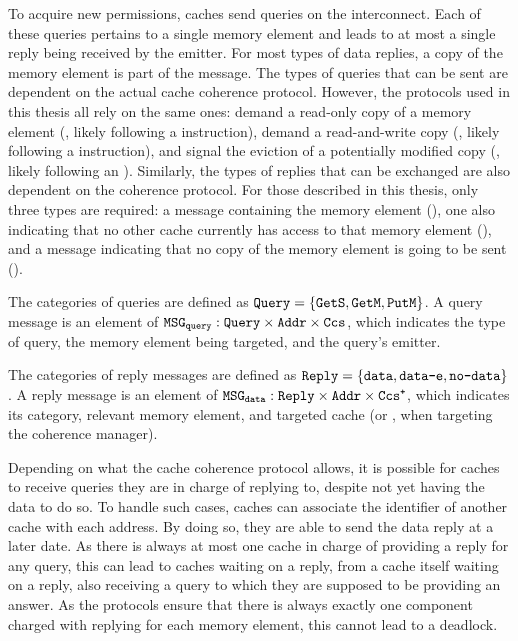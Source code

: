 To acquire new permissions, caches send queries on the interconnect. Each of
these queries pertains to a single memory element and leads to at most a single
reply being received by the emitter. For most types of data replies, a copy of
the memory element is part of the message. The types of queries that can be
sent are dependent on the actual cache coherence protocol. However, the
protocols used in this thesis all rely on the same ones: demand a read-only
copy of a memory element (\getsquery, likely following a \loadinstr{}
instruction), demand a read-and-write copy (\getmquery, likely following a
\storeinstr{} instruction), and signal the eviction of a potentially modified
copy (\putmquery, likely following an \evictinstr{}). Similarly, the
types of replies that can be exchanged are also dependent on the coherence
protocol. For those described in this thesis, only three types are required: a
message containing the memory element (\simpledata), one also indicating that
no other cache currently has access to that memory element (\exclusivedata),
and a message indicating that no copy of the memory element is going to be sent
(\nodata).

\begin{definition}[Query]
The categories of queries are defined as $\text{\texttt{Query}}{} = \{\text{\texttt{GetS}},
\text{\texttt{GetM}}, \text{\texttt{PutM}}\}$. A query message is an element of
$\text{\texttt{MSG\textsubscript{query}}}{}: \text{\texttt{Query}}{} \times \text{\texttt{Addr}}{} \times \text{\texttt{Ccs}}$, which
indicates the type of query, the memory element being targeted, and the
query's emitter.
\end{definition}

\begin{definition}[Reply]
The categories of reply messages are defined as $\text{\texttt{Reply}}{} = \{\text{\texttt{data}},
\allowbreak{}
\text{\texttt{data-e}},\allowbreak{} \text{\texttt{no-data}}\}$. A reply message is an element of $\text{\texttt{MSG\textsubscript{data}}}{}:
\text{\texttt{Reply}}{} \times \text{\texttt{Addr}}{} \times \text{\texttt{Ccs\textsuperscript{+}}}{}$, which indicates
its category, relevant memory element, and targeted cache (or \cmgr{}, when
targeting the coherence manager).
\end{definition}

Depending on what the cache coherence protocol allows, it is possible for
caches to receive queries they are in charge of replying to, despite not yet
having the data to do so. To handle such cases, caches can associate the
identifier of another cache with each address. By doing so, they are able to
send the data reply at a later date. As there is always at most one cache in
charge of providing a reply for any query, this can lead to caches waiting on a
reply, from a cache itself waiting on a reply, also receiving a query to which
they are supposed to be providing an answer. As the protocols ensure that there
is always exactly one component charged with replying for each memory element,
this cannot lead to a deadlock.

